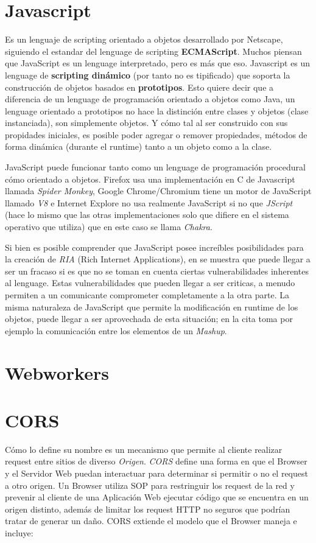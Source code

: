 \section{Javascript}
Es un lenguaje de scripting orientado a objetos desarrollado por Netscape, siguiendo el estandar del lenguage de scripting \textbf{ECMAScript}. Muchos piensan que JavaScript es un lenguage interpretado, pero es más que eso. Javascript es un lenguage de \textbf{scripting dinámico} (por tanto no es tipificado) que soporta la construcción de objetos basados en \textbf{prototipos}. Esto quiere decir que a diferencia de un lenguage de programación orientado a objetos como Java, un lenguage orientado a prototipos no hace la distinción entre clases y objetos (clase instanciada), son simplemente objetos. Y cómo tal al ser construido con sus propidades iniciales, es posible poder agregar o remover propiedades, métodos de forma dinámica (durante el runtime) tanto a un objeto como a la clase.
        
JavaScript puede funcionar tanto como un lenguage de programación procedural cómo orientado a objetos. Firefox usa una implementación en C de Javascript llamada \textit{Spider Monkey}, Google Chrome/Chromium tiene un motor de JavaScript llamado \textit{V8} e Internet Explore no usa realmente JavaScript si no que \textit{JScript} (hace lo mismo que las otras implementaciones solo que difiere en el sistema operativo que utiliza) que en este caso se llama \textit{Chakra}.
        
Si bien es posible comprender que JavaScript posee increíbles posibilidades para la creación de \textit{RIA} (Rich Internet Applications), en \cite{barth2009attacks} se muestra que puede llegar a ser un fracaso si es que no se toman en cuenta ciertas vulnerabilidades inherentes al lenguage. Estas vulnerabilidades que pueden llegar a ser criticas, a menudo permiten a un comunicante comprometer completamente a la otra parte. La misma naturaleza de JavaScript que permite la modificación en runtime de los objetos, puede llegar a ser aprovechada de esta situación; en la cita toma por ejemplo la comunicación entre los elementos de un \textit{Mashup}.

\section{Webworkers}

\section{CORS}
Cómo lo define su nombre es un mecanismo que permite al cliente realizar request entre sitios de diverso \textit{Origen}. \textit{CORS} define una forma en que el Browser y el Servidor Web puedan interactuar para determinar si permitir o no el request a otro origen. Un Browser utiliza SOP para restringuir los request de la red y prevenir al cliente de una Aplicación Web ejecutar código que se encuentra en un origen distinto, además de limitar los request HTTP no seguros que podrían tratar de generar un daño. CORS extiende el modelo que el Browser maneja e incluye:
    
